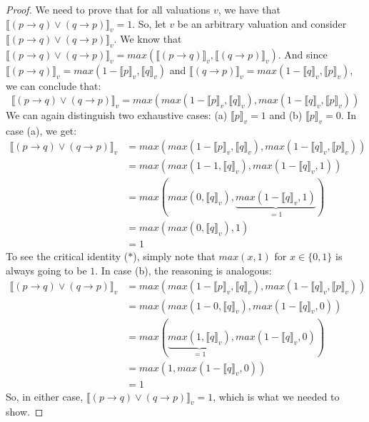\begin{enumerate}[\thesection.1]
\begin{enumerate}[(i)]
			\begin{proof}
			We need to prove that for all valuations $v$, we have that $\llbracket (p\to q)\lor (q\to p)\rrbracket_v=1$. So, let $v$ be an arbitrary valuation and consider $\llbracket (p\to q)\lor (q\to p)\rrbracket_v$. We know that $\llbracket (p\to q)\lor (q\to p)\rrbracket_v=max(\llbracket (p\to q)\rrbracket_v, \llbracket (q\to p)\rrbracket_v)$. And since $ \llbracket (p\to q)\rrbracket_v=max(1-\llbracket p\rrbracket_v,\llbracket q\rrbracket_v)$ and $ \llbracket (q\to p)\rrbracket_v=max(1-\llbracket q\rrbracket_v,\llbracket p\rrbracket_v)$, we can conclude that: \[\llbracket (p\to q)\lor (q\to p)\rrbracket_v=max(max(1-\llbracket p\rrbracket_v,\llbracket q\rrbracket_v),max(1-\llbracket q\rrbracket_v,\llbracket p\rrbracket_v))\] 
			We can again distinguish two exhaustive cases: (a) $\llbracket p\rrbracket_v=1$ and (b) $\llbracket p\rrbracket_v=0$. In case (a), we get:
			\begin{align*}
			\llbracket (p\to q)\lor (q\to p)\rrbracket_v&=max(max(1-\llbracket p\rrbracket_v,\llbracket q\rrbracket_v),max(1-\llbracket q\rrbracket_v,\llbracket p\rrbracket_v))\\
			&=max(max(1-1,\llbracket q\rrbracket_v),max(1-\llbracket q\rrbracket_v,1))\\
			&=max(max(0,\llbracket q\rrbracket_v),\underbrace{max(1-\llbracket q\rrbracket_v,1)}_{=1})\tag{$\ast$}\\
			&=max(max(0,\llbracket q\rrbracket_v),1)\\
			&=1
			\end{align*}
To see the critical identity ($\ast$), simply note that $max(x,1)$ for $x\in\{0,1\}$ is always going to be $1$. In case (b), the reasoning is analogous:
\begin{align*}
			\llbracket (p\to q)\lor (q\to p)\rrbracket_v&=max(max(1-\llbracket p\rrbracket_v,\llbracket q\rrbracket_v),max(1-\llbracket q\rrbracket_v,\llbracket p\rrbracket_v))\\
			&=max(max(1-0,\llbracket q\rrbracket_v),max(1-\llbracket q\rrbracket_v,0))\\
			&=max(\underbrace{max(1,\llbracket q\rrbracket_v)}_{=1},max(1-\llbracket q\rrbracket_v,0))\\
			&=max(1,max(1-\llbracket q\rrbracket_v,0))\\
			&=1
			\end{align*}
	So, in either case, $\llbracket (p\to q)\lor (q\to p)\rrbracket_v=1$, which is what we needed to show.
			\end{proof}

\end{enumerate}
\end{enumerate}
